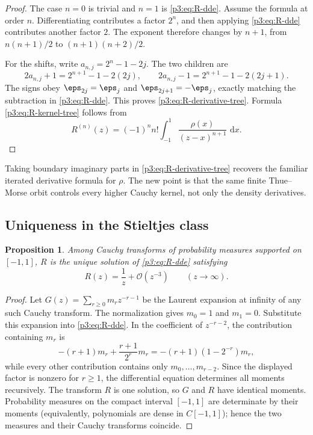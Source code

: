 \documentclass[11pt,oneside]{article}
\newtheorem{proposition}[theorem]{Proposition}
\theoremstyle{definition}
\newcommand{\dd}{\,\mathrm d}
\newcommand{\bigO}{\mathcal O}
\begin{document}
\begin{proof}
The case \(n=0\) is trivial and \(n=1\) is \eqref{p3:eq:R-dde}.  Assume the formula at
order \(n\).  Differentiating contributes a factor \(2^n\), and then applying
\eqref{p3:eq:R-dde} contributes another factor \(2\).  The exponent therefore changes by
\(n+1\), from \(n(n+1)/2\) to \((n+1)(n+2)/2\).

For the shifts, write \(a_{n,j}=2^n-1-2j\).  The two children are
\[
 2a_{n,j}+1=2^{n+1}-1-2(2j),
 \qquad
 2a_{n,j}-1=2^{n+1}-1-2(2j+1).
\]
The signs obey \(\eps_{2j}=\eps_j\) and \(\eps_{2j+1}=-\eps_j\), exactly matching the
subtraction in \eqref{p3:eq:R-dde}.  This proves \eqref{p3:eq:R-derivative-tree}.  Formula
\eqref{p3:eq:R-kernel-tree} follows from
\[
 R^{(n)}(z)=(-1)^n n!\int_{-1}^{1}\frac{\rho(x)}{(z-x)^{n+1}}\,\dd x.
\]
\end{proof}

Taking boundary imaginary parts in \eqref{p3:eq:R-derivative-tree} recovers the familiar
iterated derivative formula for \(\rho\).  The new point is that the same finite
Thue--Morse orbit controls every higher Cauchy kernel, not only the density derivatives.

\subsection{Uniqueness in the Stieltjes class}

\begin{proposition}\label{p3:prop:R-uniqueness}
Among Cauchy transforms of probability measures supported on \([-1,1]\), \(R\) is the
unique solution of \eqref{p3:eq:R-dde} satisfying
\begin{equation}
 R(z)=\frac1z+\bigO(z^{-3})\qquad(z\to\infty).               \label{p3:eq:R-normalization}
\end{equation}
\end{proposition}

\begin{proof}
Let \(G(z)=\sum_{r\ge0}m_r z^{-r-1}\) be the Laurent expansion at infinity of any such
Cauchy transform.  The normalization gives \(m_0=1\) and \(m_1=0\).  Substitute this
expansion into \eqref{p3:eq:R-dde}.  In the coefficient of \(z^{-r-2}\), the contribution
containing \(m_r\) is
\[
 -(r+1)m_r+\frac{r+1}{2^r}m_r
 =-(r+1)(1-2^{-r})m_r,
\]
while every other contribution contains only \(m_0,\ldots,m_{r-2}\).  Since the displayed
factor is nonzero for \(r\ge1\), the differential equation determines all moments
recursively.  The transform \(R\) is one solution, so \(G\) and \(R\) have identical
moments.  Probability measures on the compact interval \([-1,1]\) are determinate by their
moments (equivalently, polynomials are dense in \(C[-1,1]\)); hence the two measures and
their Cauchy transforms coincide.
\end{proof}
\end{document}
